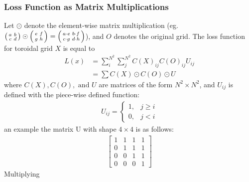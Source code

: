 \subsubsection{Loss Function as Matrix Multiplications}%
\label{ssub:loss_function_as_matrix_multiplications}
Let $\odot$ denote the element-wise matrix multiplication
(eg.~$
\begin{psmallmatrix}
    a&b\\
    c&d
\end{psmallmatrix}\odot
\begin{psmallmatrix}
    e&f\\
    g&h
\end{psmallmatrix}=
\begin{psmallmatrix}
    a\cdot e&b\cdot f\\
    c\cdot g&d\cdot h
\end{psmallmatrix}
$), and $O$ denotes the original grid. The loss function for toroidal grid $X$ is equal to
\begin{align*}
    L(x)&=\sum_i^{N^2}\sum_j^{N^2}C(X)_{ij}C(O)_{ij}U_{ij}\\
        &=\sum C(X)\odot C(O)\odot U
\end{align*}
where $C(X),C(O),\text{ and }U$ are matrices of the form $N^2\times N^2$, and $U_{ij}$ is defined with the piece-wise defined function:
\begin{align*}
    U_{ij}=
    \begin{cases}
        1, & j\geq i \\
        0, & j<i
    \end{cases}
\end{align*}
an example the matrix U with shape $4\times 4$ is as follows:
 \begin{align*}
    \begin{bmatrix}
        1&1&1&1\\
        0&1&1&1\\
        0&0&1&1\\
        0&0&0&1
    \end{bmatrix}
\end{align*}
Multiplying

